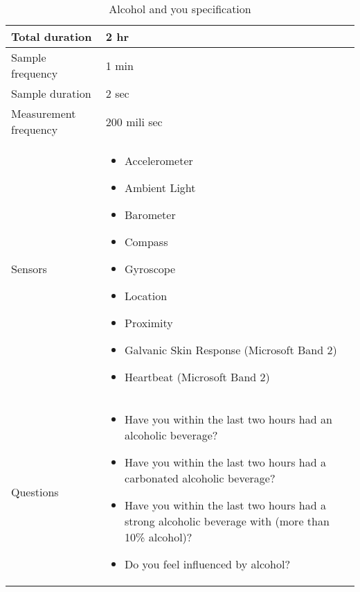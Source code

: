 \begin{table}[!htbp]
    \centering
	\begin{tabular}{|m{}|m{}|} \hline
	Total duration        & 2 hr                                                                                                                                                                                                                                                           \\ \hline
	Sample frequency      & 1 min                                                                                                                                                                                                                                                          \\ \hline
	Sample duration       & 2 sec                                                                                                                                                                                                                                                          \\ \hline
	Measurement frequency & 200 mili sec                                                                                                                                                                                                                                                   \\ \hline
	Sensors               & \begin{itemize}[noitemsep]
								\item Accelerometer 
								\item Ambient Light
								\item Barometer
								\item Compass
								\item Gyroscope
								\item Location
								\item Proximity
								\item Galvanic Skin Response (Microsoft Band 2)
								\item Heartbeat (Microsoft Band 2)
							\end{itemize} \\\hline
	Questions             & \begin{itemize}[noitemsep]
								\item Have you within the last two hours had an alcoholic beverage?
								\item Have you within the last two hours had a carbonated alcoholic beverage?
								\item Have you within the last two hours had a strong alcoholic beverage with (more than 10\% alcohol)?
								\item Do you feel influenced by alcohol?
							\end{itemize} \\ \hline
	\end{tabular}
	\caption{Alcohol and you specification}
	\label{tab:test_campaign_spec}
\end{table}
\FloatBarrier

